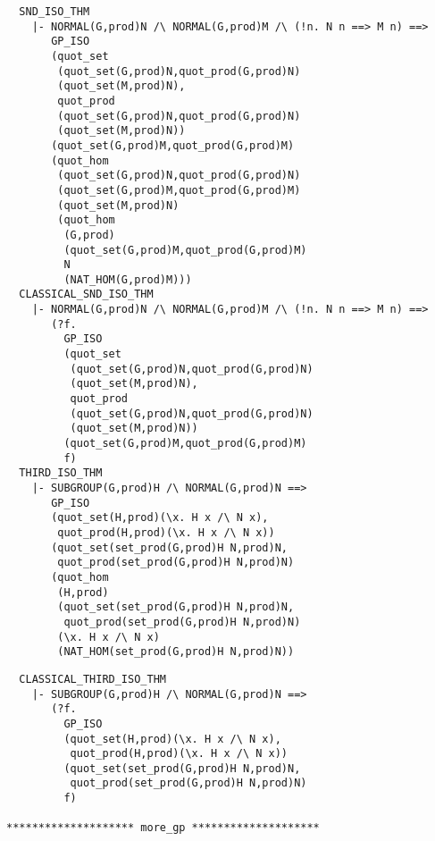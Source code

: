 \newpage
\begin{verbatim}
  SND_ISO_THM
    |- NORMAL(G,prod)N /\ NORMAL(G,prod)M /\ (!n. N n ==> M n) ==>
       GP_ISO
       (quot_set
        (quot_set(G,prod)N,quot_prod(G,prod)N)
        (quot_set(M,prod)N),
        quot_prod
        (quot_set(G,prod)N,quot_prod(G,prod)N)
        (quot_set(M,prod)N))
       (quot_set(G,prod)M,quot_prod(G,prod)M)
       (quot_hom
        (quot_set(G,prod)N,quot_prod(G,prod)N)
        (quot_set(G,prod)M,quot_prod(G,prod)M)
        (quot_set(M,prod)N)
        (quot_hom
         (G,prod)
         (quot_set(G,prod)M,quot_prod(G,prod)M)
         N
         (NAT_HOM(G,prod)M)))
  CLASSICAL_SND_ISO_THM
    |- NORMAL(G,prod)N /\ NORMAL(G,prod)M /\ (!n. N n ==> M n) ==>
       (?f.
         GP_ISO
         (quot_set
          (quot_set(G,prod)N,quot_prod(G,prod)N)
          (quot_set(M,prod)N),
          quot_prod
          (quot_set(G,prod)N,quot_prod(G,prod)N)
          (quot_set(M,prod)N))
         (quot_set(G,prod)M,quot_prod(G,prod)M)
         f)
  THIRD_ISO_THM
    |- SUBGROUP(G,prod)H /\ NORMAL(G,prod)N ==>
       GP_ISO
       (quot_set(H,prod)(\x. H x /\ N x),
        quot_prod(H,prod)(\x. H x /\ N x))
       (quot_set(set_prod(G,prod)H N,prod)N,
        quot_prod(set_prod(G,prod)H N,prod)N)
       (quot_hom
        (H,prod)
        (quot_set(set_prod(G,prod)H N,prod)N,
         quot_prod(set_prod(G,prod)H N,prod)N)
        (\x. H x /\ N x)
        (NAT_HOM(set_prod(G,prod)H N,prod)N))
\end{verbatim}
\newpage
\begin{verbatim}
  CLASSICAL_THIRD_ISO_THM
    |- SUBGROUP(G,prod)H /\ NORMAL(G,prod)N ==>
       (?f.
         GP_ISO
         (quot_set(H,prod)(\x. H x /\ N x),
          quot_prod(H,prod)(\x. H x /\ N x))
         (quot_set(set_prod(G,prod)H N,prod)N,
          quot_prod(set_prod(G,prod)H N,prod)N)
         f)
  
******************** more_gp ********************

\end{verbatim}
